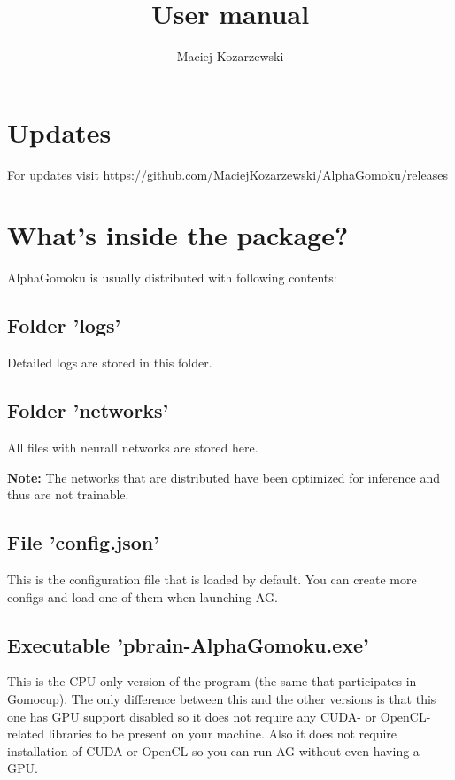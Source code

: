\documentclass[12pt,a4paper]{article}
\title{User manual}
\author{Maciej Kozarzewski}
\date{ }
\begin{document}
\maketitle

\tableofcontents


\newpage
\section{Updates}
For updates visit \href{https://github.com/MaciejKozarzewski/AlphaGomoku/releases}{https://github.com/MaciejKozarzewski/AlphaGomoku/releases}

\newpage
\section{What's inside the package?}
\label{package}
AlphaGomoku is usually distributed with following contents:

\subsection{Folder 'logs'}
Detailed logs are stored in this folder.

\subsection{Folder 'networks'}
All files with neurall networks are stored here.

\textbf{Note:} The networks that are distributed have been optimized for inference and thus are not trainable.

\subsection{File 'config.json'}
This is the configuration file that is loaded by default. You can create more configs and load one of them when launching AG.

\subsection{Executable 'pbrain-AlphaGomoku.exe'}
This is the CPU-only version of the program (the same that participates in Gomocup). The only difference between this and the other versions is that this one has GPU support disabled so it does not require any CUDA- or OpenCL-related libraries to be present on your machine. Also it does not require installation of CUDA or OpenCL so you can run AG without even having a GPU.
\end{document}
